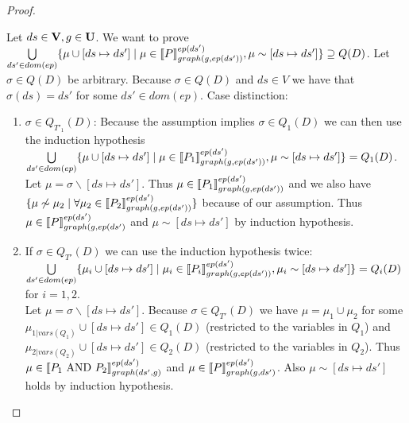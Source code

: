 \begin{proof}
\begin{enumerate}
	\bigskip\noindent
	Let $ds \in \mathbf{V}, g \in \mathbf{U}$.
	We want to prove  
	$\bigcup\limits_{ds' \in dom(ep)} \{ \mu \cup [ds \mapsto ds'] \mid\\ \mu
	\in \llbracket P \rrbracket^{ep(ds')}_{graph(g,ep(ds'))}, \mu \sim [ds\mapsto ds'] \}
	\supseteq Q(D) $.
	Let $\sigma \in Q(D)$ be arbitrary.
	Because $\sigma \in Q(D)$ and $ds \in V$ we have that $\sigma(ds) =
	ds'$ for some $ds' \in dom(ep)$.
	Case distinction:
	\begin{enumerate}
		\item $\sigma \in Q_{T'_1}(D)$: Because the assumption implies $\sigma
			\in Q_1(D)$ we can then use the induction hypothesis  
			$\bigcup\limits_{ds' \in dom(ep)} \{ \mu \cup [ds \mapsto ds'] \mid \mu
			\in \llbracket P_1 \rrbracket^{ep(ds')}_{graph(g,ep(ds'))}, \mu \sim [ds\mapsto ds'] \}  =
			Q_1(D) $. Let $\mu = \sigma \backslash [ds \mapsto ds']$. 
			Thus $\mu \in \llbracket P_1 \rrbracket^{ep(ds')}_{graph(g,ep(ds'))}$ 
			and we also have $\{\mu \not\sim \mu_2 \mid \forall \mu_2 \in
			\llbracket P_2 \rrbracket^{ep(ds')}_{graph(g,ep(ds'))} \}$ because of our
			assumption. Thus $\mu \in \llbracket P
			\rrbracket_{graph(g,ep(ds')}^{ep(ds')}$ and $\mu \sim [ds \mapsto ds']$ by
			induction hypothesis.
		\item If $\sigma \in Q_{T'}(D)$  we can use the induction hypothesis twice:\\
			$\bigcup\limits_{ds' \in dom(ep)} \{ \mu_i \cup [ds \mapsto ds'] \mid \mu_i
			\in \llbracket P_i \rrbracket^{ep(ds')}_{graph(g,ep(ds'))}, \mu_i \sim [ds\mapsto ds'] \}  =
			Q_i(D)$ for $i=1,2$.\\
			Let $\mu = \sigma \backslash [ds \mapsto ds']$.
			Because $\sigma \in Q_{T'}(D)$ we have $\mu = \mu_1 \cup \mu_2$ for
			some $\mu_{1|vars(Q_1)}\cup[ds \mapsto ds'] \in Q_1(D)$ (restricted to
			the variables in $Q_1$) and $\mu_{2|vars(Q_2)}\cup [ds \mapsto ds'] \in Q_2(D)$ (restricted to
			the variables in $Q_2$).
			Thus $\mu \in \llbracket P_1 \mbox{ AND } P_2 \rrbracket^{ep(ds')}_{graph(ds',g)}$
			and $\mu \in \llbracket P \rrbracket^{ep(ds')}_{graph(g,ds')}$. Also $\mu \sim [ds \mapsto
			ds']$ holds by induction hypothesis.
	\end{enumerate}


\end{enumerate}
\end{proof}
